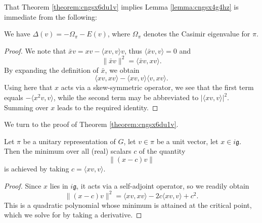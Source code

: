 \documentclass[reqno]{amsart} 
\begin{document}
That Theorem \ref{theorem:cngsx6du1v} implies Lemma \ref{lemma:cngsx4g4hz} is immediate from the following:
\begin{lemma}\label{lemma:cngsx6fp2j}
  We have $\Delta(v) = - \Omega_\pi - E(v)$, where $\Omega_\pi$ denotes the Casimir eigenvalue for $\pi$.
\end{lemma}
\begin{proof}
  We note that $\bar{x} v = x v - \langle x v, v \rangle v$, thus $\langle \bar{x} v, v \rangle = 0$ and
  \begin{equation*}
    \lVert \bar{x} v \rVert^2
    =
    \langle \bar{x} v, x v \rangle.
  \end{equation*}
  By expanding the definition of $\bar{x}$, we obtain
  \begin{equation*}
    \langle x v, x v \rangle
    -
    \langle x v, v \rangle \langle v, x v \rangle.
  \end{equation*}
  Using here that $x$ acts via a skew-symmetric operator, we see that the first term equals $- \langle x^2 v, v \rangle$, while the second term  may be abbreviated to $\lvert \langle x v, v \rangle \rvert^2$.  Summing over $x$ leads to the required identity.
\end{proof}

We turn to the proof of Theorem \ref{theorem:cngsx6du1v}.

\begin{lemma}\label{lemma:cngsx64916}
  Let $\pi$ be a unitary representation of $G$, let $v \in \pi$ be a unit vector, let $x \in i \mathfrak{g}$.  Then the minimum over all (real) scalars $c$ of the quantity
  \begin{equation*}
    \lVert (x - c) v \rVert
  \end{equation*}
  is achieved by taking $c = \langle x v, v \rangle$.
\end{lemma}
\begin{proof}
  Since $x$ lies in $i \mathfrak{g}$, it acts via a self-adjoint operator, so we readily obtain
  \begin{equation}\label{eq:cngsx65skq}
    \lVert (x-c) v \rVert^2
    = \langle x v, x v \rangle
    - 2 c \langle x v, v \rangle
    + c^2.
  \end{equation}
  This is a quadratic polynomial whose minimum is attained at the critical point, which we solve for by taking a derivative.
\end{proof}
\end{document}
